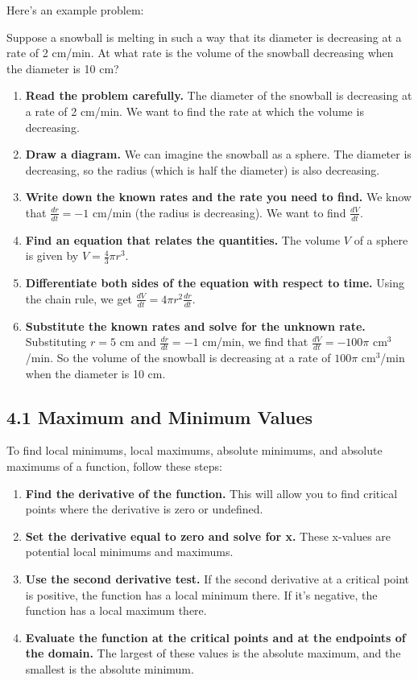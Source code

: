 \documentclass{article}
\begin{document}
Here's an example problem:

Suppose a snowball is melting in such a way that its diameter is decreasing at a rate of 2 cm/min. At what rate is the volume of the snowball decreasing when the diameter is 10 cm?

\begin{enumerate}
    \item \textbf{Read the problem carefully.} The diameter of the snowball is decreasing at a rate of 2 cm/min. We want to find the rate at which the volume is decreasing.
    \item \textbf{Draw a diagram.} We can imagine the snowball as a sphere. The diameter is decreasing, so the radius (which is half the diameter) is also decreasing.
    \item \textbf{Write down the known rates and the rate you need to find.} We know that \( \frac{dr}{dt} = -1 \) cm/min (the radius is decreasing). We want to find \( \frac{dV}{dt} \).
    \item \textbf{Find an equation that relates the quantities.} The volume \( V \) of a sphere is given by \( V = \frac{4}{3} \pi r^3 \).
    \item \textbf{Differentiate both sides of the equation with respect to time.} Using the chain rule, we get \( \frac{dV}{dt} = 4 \pi r^2 \frac{dr}{dt} \).
    \item \textbf{Substitute the known rates and solve for the unknown rate.} Substituting \( r = 5 \) cm and \( \frac{dr}{dt} = -1 \) cm/min, we find that \( \frac{dV}{dt} = -100 \pi \) cm\(^3\)/min. So the volume of the snowball is decreasing at a rate of \( 100 \pi \) cm\(^3\)/min when the diameter is 10 cm.
\end{enumerate}

\subsection{4.1 Maximum and Minimum Values}

To find local minimums, local maximums, absolute minimums, and absolute maximums of a function, follow these steps:

\begin{enumerate}
    \item \textbf{Find the derivative of the function.} This will allow you to find critical points where the derivative is zero or undefined.
    \item \textbf{Set the derivative equal to zero and solve for x.} These x-values are potential local minimums and maximums.
    \item \textbf{Use the second derivative test.} If the second derivative at a critical point is positive, the function has a local minimum there. If it's negative, the function has a local maximum there.
    \item \textbf{Evaluate the function at the critical points and at the endpoints of the domain.} The largest of these values is the absolute maximum, and the smallest is the absolute minimum.
\end{enumerate}
\end{document}
